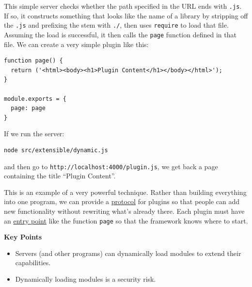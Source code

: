 This simple server checks whether the path specified in the URL ends
with \texttt{.js}. If so, it constructs something that looks like the
name of a library by stripping off the \texttt{.js} and prefixing the
stem with \texttt{./}, then uses \texttt{require} to load that file.
Assuming the load is successful, it then calls the \texttt{page}
function defined in that file. We can create a very simple plugin like
this:

\begin{verbatim}
function page() {
  return ('<html><body><h1>Plugin Content</h1></body></html>');
}

module.exports = {
  page: page
}
\end{verbatim}

If we run the server:

\begin{verbatim}
node src/extensible/dynamic.js
\end{verbatim}

and then go to \texttt{http://localhost:4000/plugin.js}, we get back a
page containing the title ``Plugin Content''.

This is an example of a very powerful technique. Rather than building
everything into one program, we can provide a
\protect\hyperlink{g:protocol}{protocol} for plugins so that people can
add new functionality without rewriting what's already there. Each
plugin must have an \protect\hyperlink{g:entry-point}{entry point} like
the function \texttt{page} so that the framework knows where to start.

\textbf{Key Points}

\begin{itemize}
\tightlist
\item
  Servers (and other programs) can dynamically load modules to extend
  their capabilities.
\item
  Dynamically loading modules is a security risk.
\end{itemize}
